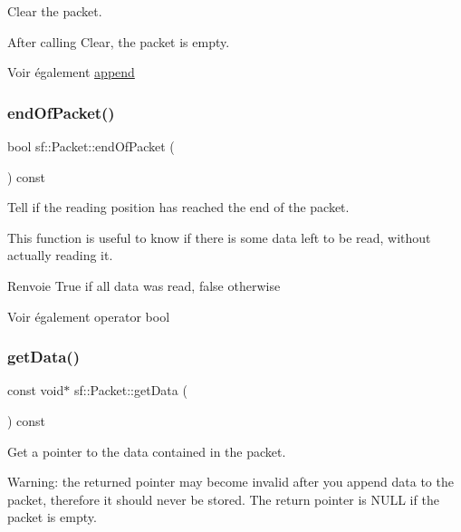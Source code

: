 Clear the packet. 

After calling Clear, the packet is empty.

\begin{DoxySeeAlso}{Voir également}
\hyperlink{classsf_1_1Packet_a7dd6e429b87520008326c4d71f1cf011}{append} 
\end{DoxySeeAlso}
\mbox{\label{classsf_1_1Packet_a61e354fa670da053907c14b738839560}} 
\subsubsection{\texorpdfstring{end\+Of\+Packet()}{endOfPacket()}}
{\footnotesize\ttfamily bool sf\+::\+Packet\+::end\+Of\+Packet (\begin{DoxyParamCaption}{ }\end{DoxyParamCaption}) const}



Tell if the reading position has reached the end of the packet. 

This function is useful to know if there is some data left to be read, without actually reading it.

\begin{DoxyReturn}{Renvoie}
True if all data was read, false otherwise
\end{DoxyReturn}
\begin{DoxySeeAlso}{Voir également}
operator bool 
\end{DoxySeeAlso}
\mbox{\label{classsf_1_1Packet_abfd771803c822f89f187e1fcc2af5afc}} 
\subsubsection{\texorpdfstring{get\+Data()}{getData()}}
{\footnotesize\ttfamily const void$\ast$ sf\+::\+Packet\+::get\+Data (\begin{DoxyParamCaption}{ }\end{DoxyParamCaption}) const}



Get a pointer to the data contained in the packet. 

Warning\+: the returned pointer may become invalid after you append data to the packet, therefore it should never be stored. The return pointer is N\+U\+LL if the packet is empty.

